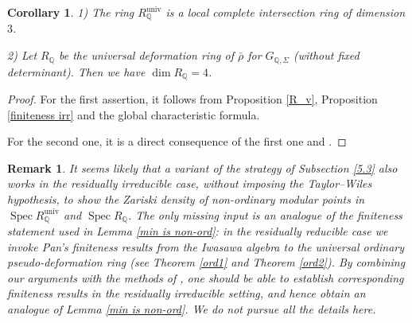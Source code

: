 \documentclass[a4paper, 12pt]{amsart}
\newtheorem{cor}[thm]{Corollary}
\newtheorem{rem}[thm]{\bf Remark}
\DeclareMathOperator{\Spec}{Spec}
\newcommand{\Q}{\mathbb{Q}}
\begin{document}
    \begin{cor}\label{dim in irr case}
    	1) The ring $R_\Q^{\operatorname{univ}}$ is a local complete intersection ring of dimension $3$. 
    	
    	2) Let $R_{\Q}$ be the universal deformation ring of $\bar{\rho}$ for $G_{\Q, \Sigma}$ (without fixed determinant). Then we have $\dim R_{\Q}=4$.
    \end{cor}
    
    \begin{proof}
    	For the first assertion, it follows from Proposition \ref{R_v}, Proposition \ref{finiteness irr} and the global characteristic formula.
    	
    	For the second one, it is a direct consequence of the first one and \cite[Lemma 6.1.2]{Allen_2019}.
    \end{proof}
    
    \begin{rem}\label{rem irr}
    	It seems likely that a variant of the strategy of Subsection \ref{5.3} also works in the residually irreducible case, without imposing the Taylor–Wiles hypothesis, to show the Zariski density of non-ordinary modular points in  $\Spec R_\Q^{\operatorname{univ}}$ and $\Spec R_{\Q}$. The only missing input is an analogue of the finiteness statement used in Lemma \ref{min is non-ord}: in the residually reducible case we invoke Pan’s finiteness results from the Iwasawa algebra to the universal ordinary pseudo-deformation ring (see Theorem \ref{ord1} and Theorem \ref{ord2}). 
    	By combining our arguments with the methods of \cite{skinnerwiles01}, one should be able to establish corresponding finiteness results in the residually irreducible setting, and hence obtain an analogue of Lemma \ref{min is non-ord}. We do not pursue all the details here.
    \end{rem}
    


~
\end{document}

